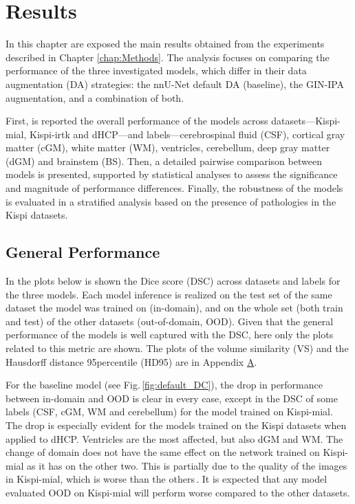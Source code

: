 \chapter{Results} \label{chap:Results}
\vspace{1cm}

In this chapter are exposed the main results obtained from the experiments described in Chapter \ref{chap:Methods}. The analysis focuses on comparing the performance of the three investigated models, which differ in their data augmentation (DA) strategies: the nnU-Net default DA (baseline), the GIN-IPA augmentation, and a combination of both.

First, is reported the overall performance of the models across datasets---Kispi-mial, Kispi-irtk and dHCP---and labels---cerebrospinal fluid (CSF), cortical gray matter (cGM), white matter (WM), ventricles, cerebellum, deep gray matter (dGM) and brainstem (BS). Then, a detailed pairwise comparison between models is presented, supported by statistical analyses to assess the significance and magnitude of performance differences. Finally, the robustness of the models is evaluated in a stratified analysis based on the presence of pathologies in the Kispi datasets.

\section{General Performance} \label{sec:GeneralPerformance}
In the plots below is shown the Dice score (DSC) across datasets and labels for the three models. Each model inference is realized on the test set of the same dataset the model was trained on (in-domain), and on the whole set (both train and test) of the other datasets (out-of-domain, OOD). Given that the general performance of the models is well captured with the DSC, here only the plots related to this metric are shown. The plots of the volume similarity (VS) and the Hausdorff distance 95\th percentile (HD95) are in Appendix \hyperref[app:SupplementaryPlots]{A}.

For the baseline model (see Fig.\,\ref{fig:default_DC}), the drop in performance between in-domain and OOD is clear in every case, except in the DSC of some labels (CSF, cGM, WM and cerebellum) for the model trained on Kispi-mial. The drop is especially evident for the models trained on the Kispi datasets when applied to dHCP. Ventricles are the most affected, but also dGM and WM. The change of domain does not have the same effect on the network trained on Kispi-mial as it has on the other two. This is partially due to the quality of the images in Kispi-mial, which is worse than the others\,\cite{FeTA2021_review}. It is expected that any model evaluated OOD on Kispi-mial will perform worse compared to the other datasets.


